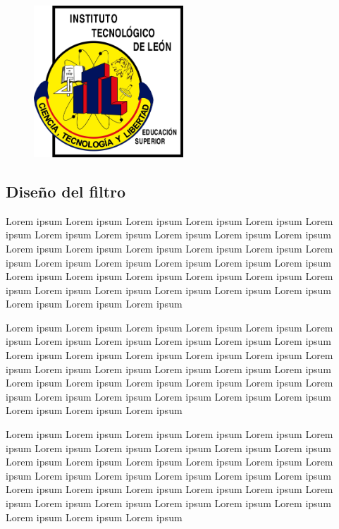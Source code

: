 \documentclass[12pt]{article}
\begin{document}
\begin{figure}[H]
	\begin{center}
		\includegraphics[width = 0.5\textwidth]{itl-logo}
	\end{center} 
\end{figure}



\subsection{Diseño del filtro}


Lorem ipsum Lorem ipsum Lorem ipsum Lorem ipsum Lorem ipsum Lorem ipsum Lorem ipsum Lorem ipsum Lorem ipsum Lorem ipsum Lorem ipsum Lorem ipsum Lorem ipsum Lorem ipsum Lorem ipsum Lorem ipsum Lorem ipsum Lorem ipsum Lorem ipsum Lorem ipsum Lorem ipsum Lorem ipsum Lorem ipsum Lorem ipsum Lorem ipsum Lorem ipsum Lorem ipsum Lorem ipsum Lorem ipsum Lorem ipsum Lorem ipsum Lorem ipsum Lorem ipsum Lorem ipsum Lorem ipsum Lorem ipsum

Lorem ipsum Lorem ipsum Lorem ipsum Lorem ipsum Lorem ipsum Lorem ipsum Lorem ipsum Lorem ipsum Lorem ipsum Lorem ipsum Lorem ipsum Lorem ipsum Lorem ipsum Lorem ipsum Lorem ipsum Lorem ipsum Lorem ipsum Lorem ipsum Lorem ipsum Lorem ipsum Lorem ipsum Lorem ipsum Lorem ipsum Lorem ipsum Lorem ipsum Lorem ipsum Lorem ipsum Lorem ipsum Lorem ipsum Lorem ipsum Lorem ipsum Lorem ipsum Lorem ipsum Lorem ipsum Lorem ipsum Lorem ipsum

Lorem ipsum Lorem ipsum Lorem ipsum Lorem ipsum Lorem ipsum Lorem ipsum Lorem ipsum Lorem ipsum Lorem ipsum Lorem ipsum Lorem ipsum Lorem ipsum Lorem ipsum Lorem ipsum Lorem ipsum Lorem ipsum Lorem ipsum Lorem ipsum Lorem ipsum Lorem ipsum Lorem ipsum Lorem ipsum Lorem ipsum Lorem ipsum Lorem ipsum Lorem ipsum Lorem ipsum Lorem ipsum Lorem ipsum Lorem ipsum Lorem ipsum Lorem ipsum Lorem ipsum Lorem ipsum Lorem ipsum Lorem ipsum
\end{document}
